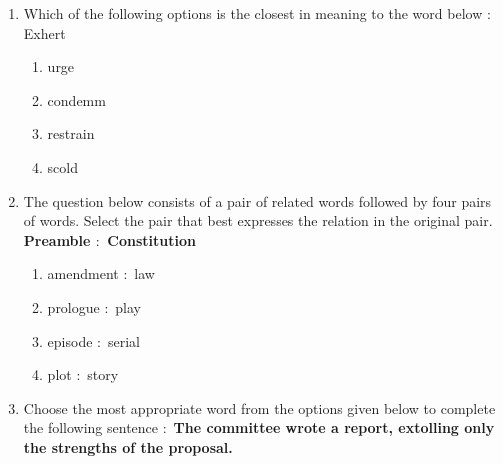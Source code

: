 \documentclass[journal,12pt,onecolumn]{IEEEtran}
\theoremstyle{remark}
\begin{document}
\begin{enumerate}
\hfill{}
\begin{multicols}{4}
\begin{enumerate}
\item $15$
\item $22$
\item $38$
\item $46$
\end{enumerate}
\end{multicols}

\section*{General Aptitude (GA) Questions}
\subsection*{Q.$56$-Q.$60$ carry one mark each.}
\item Which of the following options is the closest in meaning to the word below $\colon$
Exhert


\hfill{}

\begin{enumerate}
\item urge
\item condemm
\item restrain
\item scold
\end{enumerate}

\item The question below consists of a pair of related words followed by four pairs of words. Select the
pair that best expresses the relation in the original pair.
\textbf{Preamble $\colon$ Constitution}


\hfill{}

\begin{enumerate}
\item amendment $\colon$ law
\item prologue $\colon$ play
\item episode $\colon$ serial
\item plot $\colon$ story
\end{enumerate}

\item Choose the most appropriate word from the options given below to complete the following
sentence $\colon$
\textbf{The committee wrote a \underline{\hspace{1.5cm}} report, extolling only the strengths of the proposal.}



\end{enumerate}
\end{document}
